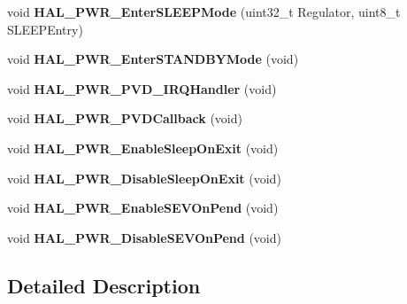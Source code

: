 \begin{DoxyCompactItemize}
\item 
void {\bfseries H\+A\+L\+\_\+\+P\+W\+R\+\_\+\+Enter\+S\+L\+E\+E\+P\+Mode} (uint32\+\_\+t Regulator, uint8\+\_\+t S\+L\+E\+E\+P\+Entry)\hypertarget{group___p_w_r___exported___functions___group2_ga5c84f4e046525c22d233c8a3443fab5f}{}\label{group___p_w_r___exported___functions___group2_ga5c84f4e046525c22d233c8a3443fab5f}

\item 
void {\bfseries H\+A\+L\+\_\+\+P\+W\+R\+\_\+\+Enter\+S\+T\+A\+N\+D\+B\+Y\+Mode} (void)\hypertarget{group___p_w_r___exported___functions___group2_ga40736f74c169077fcd08f34470559aa2}{}\label{group___p_w_r___exported___functions___group2_ga40736f74c169077fcd08f34470559aa2}

\item 
void {\bfseries H\+A\+L\+\_\+\+P\+W\+R\+\_\+\+P\+V\+D\+\_\+\+I\+R\+Q\+Handler} (void)\hypertarget{group___p_w_r___exported___functions___group2_gae3403237bde597d72b32f0434932a047}{}\label{group___p_w_r___exported___functions___group2_gae3403237bde597d72b32f0434932a047}

\item 
void {\bfseries H\+A\+L\+\_\+\+P\+W\+R\+\_\+\+P\+V\+D\+Callback} (void)\hypertarget{group___p_w_r___exported___functions___group2_gaa4843b3eb7989f5b95e1218af4086940}{}\label{group___p_w_r___exported___functions___group2_gaa4843b3eb7989f5b95e1218af4086940}

\item 
void {\bfseries H\+A\+L\+\_\+\+P\+W\+R\+\_\+\+Enable\+Sleep\+On\+Exit} (void)\hypertarget{group___p_w_r___exported___functions___group2_ga85d0154c96068b286072a64fca4c7e6a}{}\label{group___p_w_r___exported___functions___group2_ga85d0154c96068b286072a64fca4c7e6a}

\item 
void {\bfseries H\+A\+L\+\_\+\+P\+W\+R\+\_\+\+Disable\+Sleep\+On\+Exit} (void)\hypertarget{group___p_w_r___exported___functions___group2_ga1da299e8186a3e08a694865bd41c3bb0}{}\label{group___p_w_r___exported___functions___group2_ga1da299e8186a3e08a694865bd41c3bb0}

\item 
void {\bfseries H\+A\+L\+\_\+\+P\+W\+R\+\_\+\+Enable\+S\+E\+V\+On\+Pend} (void)\hypertarget{group___p_w_r___exported___functions___group2_ga6f33b1c8c8cc85129c68ac302a281033}{}\label{group___p_w_r___exported___functions___group2_ga6f33b1c8c8cc85129c68ac302a281033}

\item 
void {\bfseries H\+A\+L\+\_\+\+P\+W\+R\+\_\+\+Disable\+S\+E\+V\+On\+Pend} (void)\hypertarget{group___p_w_r___exported___functions___group2_ga7811014def9b864dd490a63ada4bab68}{}\label{group___p_w_r___exported___functions___group2_ga7811014def9b864dd490a63ada4bab68}

\end{DoxyCompactItemize}


\subsection{Detailed Description}

